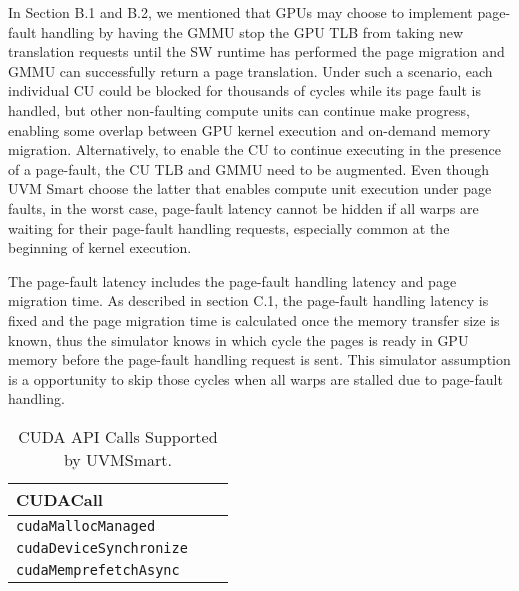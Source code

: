 In Section B.1 and B.2, we mentioned that GPUs may choose to implement page-fault handling by having the GMMU stop the GPU TLB from taking new translation requests until the SW runtime has performed the page migration and GMMU can successfully return a page translation. Under such a scenario, each individual CU could be blocked for thousands of cycles while its page fault is handled, but other non-faulting compute units can continue make progress, enabling some overlap between GPU kernel execution and on-demand memory migration. Alternatively, to enable the CU to continue executing in the presence of a page-fault, the CU TLB and GMMU need to be augmented. Even though UVM Smart choose the latter that enables compute unit execution under page faults, in the worst case, page-fault latency cannot be hidden if all warps are waiting for their page-fault handling requests, especially common at the beginning of kernel execution.

The page-fault latency includes the page-fault handling latency and page migration time. As described in section C.1, the page-fault handling latency is fixed and the page migration time is calculated once the memory transfer size is known, thus the simulator knows in which cycle the pages is ready in GPU memory before the page-fault handling request is sent. This simulator assumption is a opportunity to skip those cycles when all warps are stalled due to page-fault handling.


    \begin{table}[!htbp]
        \centering
        \setlength{\abovecaptionskip}{6pt plus 1pt minus 1pt}
        \captionsetup{width=.75\textwidth}
        \caption {CUDA API Calls Supported by UVMSmart.}
            \begin{tabular}{|l|c|c|}
                \hline
                CUDACall  \\
                \hline
                \hline
                \texttt{cudaMallocManaged}  \\
                \hline
                \texttt{cudaDeviceSynchronize}  \\
                \hline
                \texttt{cudaMemprefetchAsync}  \\
                \hline
            \end{tabular}
        \label{tab:apis}
    \end{table}